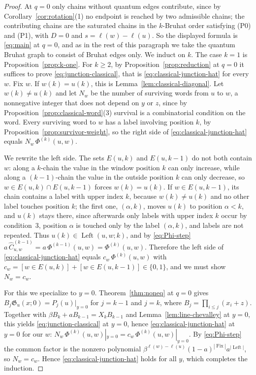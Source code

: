\documentclass[11pt]{article}
\newcommand{\G}{\mathfrak{G}}
\newcommand{\Fix}{\operatorname{Fix}}
\newcommand{\Left}{\operatorname{Left}}
\newcommand{\ellength}{\ell}
\begin{document}
\begin{proof}
At $q=0$ only chains without quantum edges contribute, since by
Corollary~\ref{cor:rotation}(1) no endpoint is reached by two
admissible chains; the contributing chains are the saturated chains
in the $k$-Bruhat order satisfying (P0) and (P1), with $D=0$ and
$s=\ellength(w)-\ellength(u)$. So the displayed formula is
\eqref{eq:main} at $q=0$, and as in the rest of this paragraph we
take the quantum Bruhat graph to consist of Bruhat edges only. We
induct on $k$. The case $k=1$ is
Proposition~\ref{prop:k-one}. For $k\geq2$, by
Proposition~\ref{prop:reduction} at $q=0$ it suffices to prove
\eqref{eq:junction-classical}, that is
\eqref{eq:classical-junction-hat} for every $w$. Fix $w$. If
$w(k)=u(k)$, this is Lemma~\ref{lem:classical-diagonal}. Let
$w(k)\neq u(k)$ and let $N_w$ be the number of surviving words from
$u$ to $w$, a nonnegative integer that does not depend on $y$ or $z$,
since by Proposition~\ref{prop:classical-word}(3) survival is a
combinatorial condition on the word. Every surviving word to $w$ has
a label involving position $k$, by Proposition~\ref{prop:survivor-weight},
so the right side of \eqref{eq:classical-junction-hat} equals
$N_w\,\Phi^{(k)}(u,w)$.

We rewrite the left side. The sets $E(u,k)$ and $E(u,k-1)$ do not both
contain $w$: along a $k$-chain the value in the window position $k$
can only increase, while along a $(k-1)$-chain the value in the
outside position $k$ can only decrease, so $w\in E(u,k)\cap E(u,k-1)$
forces $w(k)=u(k)$. If $w\in E(u,k-1)$, its chain contains a label
with upper index $k$, because $w(k)\neq u(k)$ and no other label
touches position $k$; the first one, $(\alpha,k)$, moves $u(k)$ to
position $\alpha<k$, and $u(k)$ stays there, since afterwards only
labels with upper index $k$ occur by condition~3, position $\alpha$ is
touched only by the label $(\alpha,k)$, and labels are not repeated.
Thus $u(k)\in\Left(u,w;k)$, and by
\eqref{eq:Phi-step}
$a\,\widehat C^{(k-1)}_{u,w}=a\,\Phi^{(k-1)}(u,w)=\Phi^{(k)}(u,w)$.
Therefore the left side of \eqref{eq:classical-junction-hat} equals
$c_w\,\Phi^{(k)}(u,w)$ with
$c_w=[w\in E(u,k)]+[w\in E(u,k-1)]\in\{0,1\}$, and we must show
$N_w=c_w$.

For this we specialize to $y=0$. Theorem~\ref{thm:noneq} at $q=0$
gives $B_j\G_u(x;0)=P_j(u)|_{y=0}$ for $j=k-1$ and $j=k$, where
$B_j=\prod_{i\leq j}(x_i+z)$. Together with
$\beta B_k+aB_{k-1}=X_kB_{k-1}$ and Lemma~\ref{lem:line-chevalley} at
$y=0$, this yields \eqref{eq:junction-classical} at $y=0$, hence
\eqref{eq:classical-junction-hat} at $y=0$ for our $w$:
$N_w\,\Phi^{(k)}(u,w)|_{y=0}=c_w\,\Phi^{(k)}(u,w)|_{y=0}$. By
\eqref{eq:Phi-step} the common factor is the nonzero polynomial
$\beta^{\ellength(w)-\ellength(u)}(1-a)^{|\Fix|}a^{|\Left|}$, so
$N_w=c_w$. Hence \eqref{eq:classical-junction-hat} holds for all $y$,
which completes the induction.
\end{proof}
\end{document}
